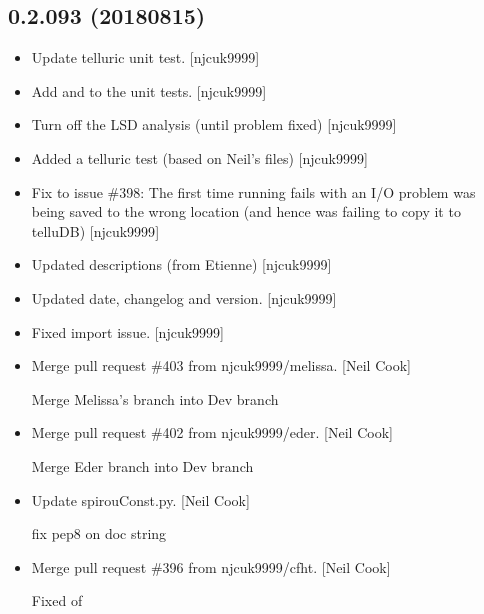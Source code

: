 \documentclass[a4paper,10pt,english]{report}
\begin{document}
\subsection{0.2.093 (2018\sphinxhyphen{}08\sphinxhyphen{}15)}
\label{\detokenize{misc/changelog:id388}}\begin{itemize}
\item {} 
Update telluric unit test. {[}njcuk9999{]}

\item {} 
Add  and  to the unit tests. {[}njcuk9999{]}

\item {} 
Turn off the LSD analysis (until problem fixed) {[}njcuk9999{]}

\item {} 
Added a telluric test (based on Neil’s files) {[}njcuk9999{]}

\item {} 
Fix to issue \#398: The first time running  fails with an
I/O problem \sphinxhyphen{}  was being saved to the wrong location (and
hence  was failing to copy it to telluDB) {[}njcuk9999{]}

\item {} 
Updated descriptions (from Etienne) {[}njcuk9999{]}

\item {} 
Updated date, changelog and version. {[}njcuk9999{]}

\item {} 
Fixed import issue. {[}njcuk9999{]}

\item {} 
Merge pull request \#403 from njcuk9999/melissa. {[}Neil Cook{]}

Merge Melissa’s branch into Dev branch

\item {} 
Merge pull request \#402 from njcuk9999/eder. {[}Neil Cook{]}

Merge Eder branch into Dev branch

\item {} 
Update spirouConst.py. {[}Neil Cook{]}

fix pep8 on doc string

\item {} 
Merge pull request \#396 from njcuk9999/cfht. {[}Neil Cook{]}

Fixed  of 

\end{itemize}
\end{document}
